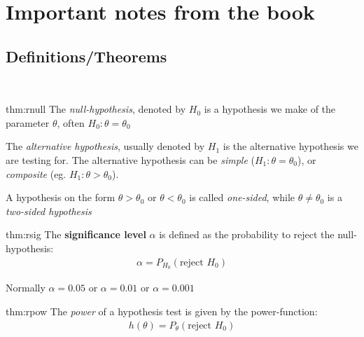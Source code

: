 \section{Important notes from the book}\par
\subsection{Definitions/Theorems}\hfill\\
\par\bigskip
\begin{theo}{thm:rnull}
  The \textit{null-hypothesis}, denoted by $H_0$ is a hypothesis we make of the parameter $\theta$, often $H_0: \theta = \theta_0$
  \par\bigskip
  \noindent The \textit{alternative hypothesis}, usually denoted by $H_1$ is the alternative hypothesis we are testing for. The alternative hypothesis can be \textit{simple} ($H_1: \theta = \theta_0$), or \textit{composite} (eg. $H_1: \theta>\theta_0$).\par
  \par\bigskip
  \noindent A hypothesis on the form $\theta>\theta_0$ or $\theta<\theta_0$ is called \textit{one-sided}, while $\theta\neq\theta_0$ is a \textit{two-sided hypothesis}
\end{theo}
\par\bigskip
\begin{theo}{thm:rsig}
  The \textbf{significance level} $\alpha$ is defined as the probability to reject the null-hypothesis:
  \begin{equation*}
    \begin{gathered}
      \alpha = P_{H_0}(\text{reject } H_0)
    \end{gathered}
  \end{equation*}
  \par\bigskip
  \noindent Normally $\alpha = 0.05$ or $\alpha = 0.01$ or $\alpha = 0.001$
\end{theo}
\par\bigskip
\begin{theo}{thm:rpow}
  The \textit{power} of a hypothesis test is given by the power-function:
  \begin{equation*}
    \begin{gathered}
      h(\theta) = P_{\theta}(\text{reject } H_0)
    \end{gathered}
  \end{equation*}
\end{theo}
